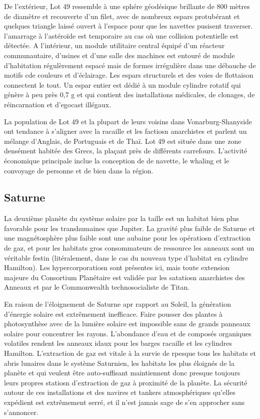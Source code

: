 De l'extérieur, Lot 49 ressemble à une sphére géodésique brillante de 800 mètres de diamètre et recouverte d'un filet, avec de nombreux espars protubérant et quelques triangle laissé ouvert à l'espace pour que les navettes pusisent traverser. l'amarrage à l'astéroïde est temporaire au cas où une collision potentielle est détectée. A l'intérieur, un module utilitaire central équipé d'un réacteur communautaire, d'usines et d'une salle des machines est entouré de module d'habitation régulèrement espacé mais de formes irrégulière dans une débauche de motifs cde couleurs et d'éclairage. Les espars structurels et des voies de flottaison connectent le tout. Un espar entier est dédié à un module cylindre rotatif qui génère à peu près 0,7 g et qui contient des installations médicales, de clonages, de réincarnation et d'egocast illégaux. 

La population de Lot 49 et la plupart de leurs voisins dans Vonarburg-Shanyside ont tendance à s'aligner avec la racaille et les factiosn anarchistes et parlent un mélange d'Anglais, de Portuguais et de Thaï. Lot 49 est située dans une zone densément habitée des Grecs, la plaçant près de différents carrefours. L'activité économique principale inclue la conception de de navette, le whaling et le convoyage de personne et de bien dans la région. 

\subsection{Saturne} \label{sec:saturn} 

La deuxième planète du système solaire par la taille est un habitat bien plus favorable pour les transhumaines que Jupiter. La gravité plus faible de Saturne et une magnétosphère plus faible sont une aubaine pour les opératiosn d'extraction de gaz, et pour les habitats gros consommateurs de ressource les anneaux sont un véritable festin (litéralement, dans le cas du nouveau type d'habitat en cylindre Hamilton). Les hypercorporatiosn sont présentes ici, mais toute extension majeure du Consortium Planétaire est validée par les satatiosn anarchistes des Anneaux et par le Commonwealth technosocialiste de Titan. 

En raison de l'éloignement de Saturne apr rapport au Soleil, la génération d'énergie solaire est extrêmement inefficace. Faire pousser des plantes à photosynthèse avec de la lumière solaire est impossible sans de grands panneaux solaire pour concentrer les rayons. L'abondance d'eau et de composés organiques volatiles rendent les anneaux idaux pour les barges racaille et les cylindres Hamilton. L'extraction de gaz est vitale à la survie de rpesque tous les habitats et abris lunaires dans le système Saturnien, les habitats les plus éloignés de la planète et qui veulent être auto-suffisant maintiennent donc presque toujours leurs propres statiosn d'extraction de gaz à proximité de la planète. La sécurité autour de ces installations et des navires et tankers atmosphériques qu'elles expédient est extrêmement serré, et il n'est jamais sage de s'en approcher sans s'annoncer. 


